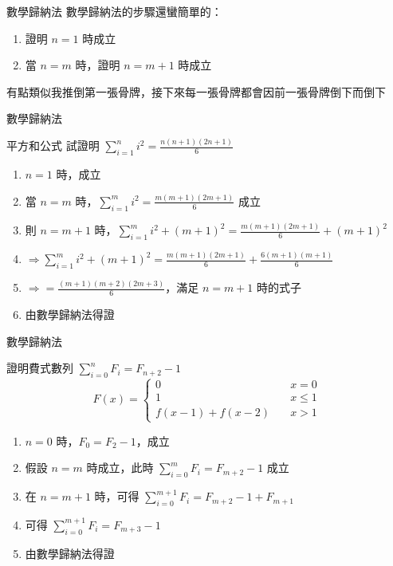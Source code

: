 \documentclass[aspectratio=169]{beamer}
\begin{document}
    \begin{frame}{數學歸納法}
        數學歸納法的步驟還蠻簡單的：
        \begin{enumerate}
            \item 證明 $n = 1$ 時成立
            \item 當 $n = m$ 時，證明 $n = m + 1$ 時成立
        \end{enumerate}

        有點類似我推倒第一張骨牌，接下來每一張骨牌都會因前一張骨牌倒下而倒下
    \end{frame}

    \begin{frame}{數學歸納法}
        \begin{block}{平方和公式}
            試證明 $\sum_{i = 1}^{n}{i ^ 2} = \frac{n(n + 1)(2n + 1)}{6}$
        \end{block}

        \begin{enumerate}
            \item<1-> $n = 1$ 時，成立 
            \item<2-> 當 $n = m$ 時，$\sum_{i = 1}^{m}{i ^ 2} = \frac{m(m + 1)(2m + 1)}{6}$ 成立
            \item<3-> 則 $n = m + 1$ 時，$\sum_{i = 1}^{m}{i ^ 2} + (m + 1)^2 = \frac{m(m + 1)(2m + 1)}{6} + (m + 1)^2$
            \item<4-> $\Rightarrow \sum_{i = 1}^{m}{i ^ 2} + (m + 1)^2 = \frac{m(m + 1)(2m + 1)}{6} + \frac{6(m + 1)(m + 1)}{6}$
            \item<5-> $\Rightarrow = \frac{(m + 1)(m + 2)(2m + 3)}{6}$，滿足 $n = m + 1$ 時的式子
            \item<6-> 由數學歸納法得證
        \end{enumerate}
    \end{frame}

    \begin{frame}{數學歸納法}
        \begin{block}{證明費式數列 $\sum_{i = 0}^{n}{F_i} = F_{n + 2} - 1$}
            $$
            F(x)  = \begin{cases}
                0 \quad & x = 0 \\
                1 \quad & x \le 1 \\
                f(x - 1) + f(x - 2) \quad & x > 1
            \end{cases}
            $$
        \end{block}

        \begin{enumerate}
            \item<1-> $n = 0$ 時，$F_0 = F_2 - 1$，成立
            \item<2-> 假設 $n = m$ 時成立，此時 $\sum_{i = 0}^{m}{F_i} = F_{m + 2} - 1$ 成立
            \item<3-> 在 $n = m + 1$ 時，可得 $\sum_{i = 0}^{m + 1}{F_i} = F_{m + 2} - 1 + F_{m + 1}$
            \item<4-> 可得 $\sum_{i = 0}^{m + 1}{F_i} = F_{m + 3} - 1$
            \item<5-> 由數學歸納法得證
        \end{enumerate}
    \end{frame}
\end{document}
